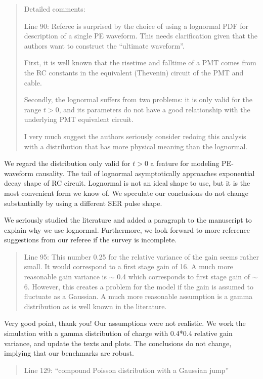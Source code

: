 \documentclass[12pt]{article}
\begin{document}
\begin{quote}

Detailed comments:

Line 90: Referee is surprised by the choice of using a lognormal PDF for description of a single PE waveform. This needs clarification given that the authors want to construct the ``ultimate waveform''.

First, it is well known that the risetime and falltime of a PMT comes from the RC constants in the equivalent (Thevenin) circuit of the PMT and cable. 

Secondly, the lognormal suffers from two problems: it is only valid for the range $t>0$, and its parameters do not have a good relationship with the underlying PMT equivalent circuit.

I very much suggest the authors seriously consider redoing this analysis with a distribution that has more physical meaning than the lognormal. 
\end{quote}

We regard the distribution only valid for $t>0$ a feature for modeling PE-waveform causality.  The tail of lognormal asymptotically approaches exponential decay shape of RC circuit. Lognormal is not an ideal shape to use, but it is the most convenient form we know of.  We speculate our conclusions do not change substantially by using a different SER pulse shape.

We seriously studied the literature and added a paragraph to the manuscript to explain why we use lognormal.  Furthermore, we look forward to more reference suggestions from our referee if the survey is incomplete.

\begin{quote}
Line 95: This number 0.25 for the relative variance of the gain seems rather small. It would correspond to a first stage gain of 16. A much more reasonable gain variance is $\sim$ 0.4 which corresponds to first stage gain of $\sim$ 6. However, this creates a problem for the model if the gain is assumed to fluctuate as a Gaussian. A much more reasonable assumption is a gamma distribution as is well known in the literature.
\end{quote}

Very good point, thank you!  Our assumptions were not realistic.  We work the simulation with a gamma distribution of charge with 0.4*0.4 relative gain variance, and update the texts and plots.  The conclusions do not change, implying that our benchmarks are robust. 

\begin{quote}
Line 129: ``compound Poisson distribution with a Gaussian jump''
\end{quote}
\end{document}
